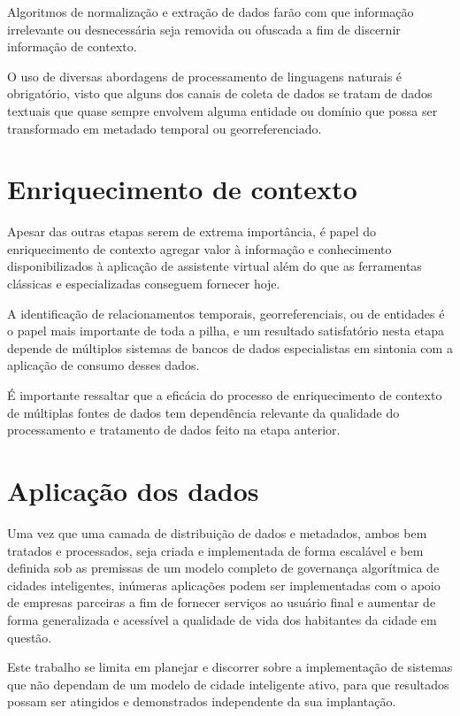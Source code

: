 Algoritmos de normalização e extração de dados farão com que informação irrelevante ou desnecessária seja removida ou ofuscada a fim de discernir informação de contexto.

O uso de diversas abordagens de processamento de linguagens naturais é obrigatório, visto que alguns dos canais de coleta de dados se tratam de dados textuais que quase sempre envolvem alguma entidade ou domínio que possa ser transformado em metadado temporal ou georreferenciado.

\section{Enriquecimento de contexto} \label{s:enriquecimento_de_contexto}

Apesar das outras etapas serem de extrema importância, é papel do enriquecimento de contexto agregar valor à informação e conhecimento disponibilizados à aplicação de assistente virtual além do que as ferramentas clássicas e especializadas conseguem fornecer hoje.

A identificação de relacionamentos temporais, georreferenciais, ou de entidades é o papel mais importante de toda a pilha, e um resultado satisfatório nesta etapa depende de múltiplos sistemas de bancos de dados especialistas em sintonia com a aplicação de consumo desses dados.

É importante ressaltar que a eficácia do processo de enriquecimento de contexto de múltiplas fontes de dados tem dependência relevante da qualidade do processamento e tratamento de dados feito na etapa anterior.

\section{Aplicação dos dados} \label{s:aplicacao_dos_dados}

Uma vez que uma camada de distribuição de dados e metadados, ambos bem tratados e processados, seja criada e implementada de forma escalável e bem definida sob as premissas de um modelo completo de governança algorítmica de cidades inteligentes, inúmeras aplicações podem ser implementadas com o apoio de empresas parceiras a fim de fornecer serviços ao usuário final e aumentar de forma generalizada e acessível a qualidade de vida dos habitantes da cidade em questão.

Este trabalho se limita em planejar e discorrer sobre a implementação de sistemas que não dependam de um modelo de cidade inteligente ativo, para que resultados possam ser atingidos e demonstrados independente da sua implantação.